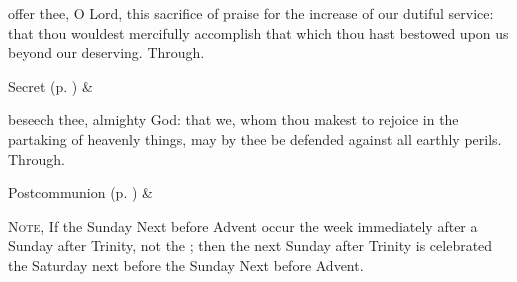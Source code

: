 
\vspace{-0.25\baselineskip}

\secret
{} offer thee, O Lord, this sacrifice of praise for the increase of our dutiful service: that thou wouldest mercifully accomplish that which thou hast bestowed upon us beyond our deserving. Through.
\begin{rubric}
     Secret  (p. \pageref{SPSaints}) \&  
\end{rubric}


\vspace{-0.25\baselineskip}

\postcommunion
{} beseech thee, almighty God: that we, whom thou makest to rejoice in the partaking of heavenly things, may by thee be defended against all earthly perils. Through.
\begin{rubric}
     Postcommunion  (p. \pageref{SPSaints}) \&  
\end{rubric}


\begin{rubric}
	\textsc{Note,} If the Sunday Next before Advent occur the week immediately after a Sunday after Trinity, not the ; then the next Sunday after Trinity is celebrated the Saturday next before the Sunday Next before Advent.
\end{rubric}


